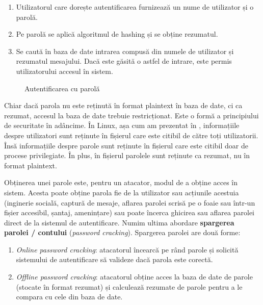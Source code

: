 \begin{enumerate}
  \item Utilizatorul care dorește autentificarea furnizează un nume de utilizator și o parolă.
  \item Pe parolă se aplică algoritmul de hashing și se obține rezumatul.
  \item Se caută în baza de date intrarea compusă din numele de utilizator și rezumatul mesajului.
    Dacă este găsită o astfel de intrare, este permis utilizatorului accesul în sistem.
\end{enumerate}

\begin{figure}[htbp]
  \centering
  \def\svgwidth{\columnwidth}
  
  \caption{Autentificarea cu parolă}
  \label{fig:sec:password-auth-hashing}
\end{figure}

Chiar dacă parola nu este reținută în format plaintext în baza de date, ci ca rezumat, accesul la baza de date trebuie restricționat.
Este o formă a principiului de securitate în adâncime.
În Linux, așa cum am prezentat în , informațiile despre utilizatori sunt reținute în fișierul  care este citibil de către toți utilizatorii.
Însă informațiile despre parole sunt reținute în fișierul  care este citibil doar de procese privilegiate.
În plus, în fișierul  parolele sunt reținute ca rezumat, nu în format plaintext.

Obținerea unei parole este, pentru un atacator, modul de a obține acces în sistem.
Acesta poate obține parola fie de la utilizator sau acțiunile acestuia (inginerie socială, captură de mesaje, aflarea parolei scrisă pe o foaie sau într-un fișier accesibil, șantaj, amenințare) sau poate încerca ghicirea sau aflarea parolei direct de la sistemul de autentificare.
Numim ultima abordare \textbf{spargerea parolei / contului} (\textit{password cracking}).
Spargerea parolei are două forme:

\begin{enumerate}
  \item \textit{Online password cracking}: atacatorul încearcă pe rând parole și solicită sistemului de autentificare să valideze dacă parola este corectă.
  \item \textit{Offline password cracking}: atacatorul obține acces la baza de date de parole (stocate în format rezumat) și calculează rezumate de parole pentru a le compara cu cele din baza de date.
\end{enumerate}

